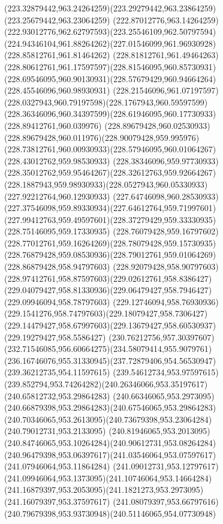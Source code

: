 {{  \curveto(223.32879442,963.24264259)(223.29279442,963.23864259)(223.25679442,963.23064259)
  \curveto(222.87012776,963.14264259)(222.93012776,962.62797593)(223.25546109,962.50797594)
  \curveto(224.94346104,961.88264262)(227.01546099,961.96930928)(228.85812761,961.81464262)
  \curveto(228.81812761,961.49464263)(228.80612761,961.17597597)(228.81546095,960.85730931)
  \curveto(228.69546095,960.90130931)(228.57679429,960.94664264)(228.45546096,960.98930931)
  \curveto(228.21546096,961.07197597)(228.0327943,960.79197598)(228.1767943,960.59597599)
  \curveto(228.36346096,960.34397599)(228.61946095,960.17730933)(228.89412761,960.039976)
  \curveto(228.89679428,960.02530933)(228.89679428,960.011976)(228.90079428,959.995976)
  \curveto(228.73812761,960.00930933)(228.57946095,960.01064267)(228.43012762,959.98530933)
  \curveto(228.38346096,959.97730933)(228.35012762,959.95464267)(228.32612763,959.92664267)
  \curveto(228.1887943,959.98930933)(228.0527943,960.05330933)(227.92212764,960.12930933)
  \curveto(227.64746098,960.28530933)(227.37546098,959.89330934)(227.64612764,959.71997601)
  \curveto(227.99412763,959.49597601)(228.37279429,959.33330935)(228.75146095,959.17330935)
  \curveto(228.76079428,959.16797602)(228.77012761,959.16264269)(228.78079428,959.15730935)
  \curveto(228.76879428,959.08530936)(228.79012761,959.01064269)(228.86879428,958.94797603)
  \curveto(228.92079428,958.90797603)(228.97412761,958.87597603)(229.02612761,958.8386427)
  \curveto(229.04079427,958.81330936)(229.06479427,958.7946427)(229.09946094,958.78797603)
  \curveto(229.12746094,958.76930936)(229.1541276,958.74797603)(229.18079427,958.7306427)
  \curveto(229.14479427,958.67997603)(229.13679427,958.60530937)(229.19279427,958.5586427)
  \curveto(230.76212756,957.30397607)(232.71546085,956.60664275)(234.58079414,955.9079761)
  \curveto(236.16746076,955.31330945)(237.72879406,954.56530947)(239.36212735,954.11597615)
  \lineto(239.54612734,953.97597615)
  \curveto(239.852794,953.74264282)(240.26346066,953.35197617)(240.65812732,953.29864283)
  \curveto(240.66346065,953.2973095)(240.66879398,953.29864283)(240.67546065,953.29864283)
  \curveto(240.70346065,953.2613095)(240.73679398,953.23064284)(240.79012731,953.2133095)
  \curveto(240.81946065,953.2013095)(240.84746065,953.10264284)(240.90612731,953.08264284)
  \curveto(240.96479398,953.06397617)(241.03546064,953.07597617)(241.07946064,953.11864284)
  \curveto(241.09012731,953.12797617)(241.09946064,953.1373095)(241.10746064,953.14664284)
  \curveto(241.16879397,953.2053095)(241.1821273,953.2973095)(241.16079397,953.37597617)
  \curveto(241.08079397,953.66797616)(240.79679398,953.93730948)(240.51146065,954.07730948)
}}
